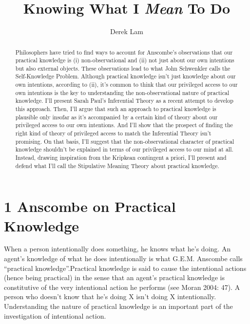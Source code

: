 \documentclass[a4paper,12pt]{article}
\title{Knowing What I \emph{Mean} To Do}
\author{Derek Lam}
\begin{document}
\maketitle

\begin{abstract}
Philosophers have tried to find ways to account for Anscombe's observations that our practical knowledge is (i) non-observational and (ii) not just about our own intentions but also external objects. These observations lead to what John Schwenkler calls the Self-Knowledge Problem. Although practical knowledge isn't just knowledge about our own intentions, according to (ii), it's common to think that our privileged access to our own intentions is the key to understanding the non-observational nature of practical knowledge. I'll present Sarah Paul's Inferential Theory as a recent attempt to develop this approach. Then, I'll argue that such an approach to practical knowledge is plausible only insofar as it's accompanied by a certain kind of theory about our privileged access to our own intentions. And I'll show that the prospect of finding the right kind of theory of privileged access to match the Inferential Theory isn't promising. On that basis, I'll suggest that the non-observational character of practical knowledge shouldn't be explained in terms of our privileged access to our mind at all. Instead, drawing inspiration from the Kripkean contingent a priori, I'll present and defend what I'll call the Stipulative Meaning Theory about practical knowledge.
\end{abstract}

\section*{1 Anscombe on Practical Knowledge}
When a person intentionally does something, he knows what he's doing. An agent's knowledge of what he does intentionally is what G.E.M. Anscombe calls ``practical knowledge''.\footnotemark Practical knowledge is said to cause the intentional actions (hence being practical) in the sense that an agent's practical knowledge is constitutive of the very intentional action he performs (see Moran 2004: 47). A person who doesn't know that he's doing X isn't doing X intentionally. Understanding the nature of practical knowledge is an important part of the investigation of intentional action.

	
\end{document}
